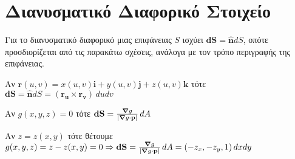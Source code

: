 \section*{Διανυσματικό Διαφορικό Στοιχείο}

\begin{dfn}
  Για το διανυσματικό διαφορικό μιας επιφάνειας $S$ ισχύει $ \mathbf{dS} =
  \mathbf{\widehat{n}}dS $, οπότε προσδιορίζεται από τις παρακάτω σχέσεις, ανάλογα με τον τρόπο περιγραφής της επιφάνειας.
  \begin{myitemize}
    \item Αν $ \mathbf{r}(u,v) = x(u,v)\mathbf{i}+y(u,v)\mathbf{j}+z(u,v)\mathbf{k} $ 
      τότε $ \mathbf{dS} = \mathbf{\widehat{n}} dS = (\mathbf{r_{u}} \times 
      \mathbf{r_{v}}) \, du dv $ 
    \item Αν $ g(x,y,z)=0 $ τότε $ \mathbf{dS} = \frac{\grad g}{\abs{\grad g 
      \cdot \mathbf{p}}}\, dA $
    \item Αν $ z=z(x,y) $ τότε θέτουμε $ g(x,y,z)=z-z(x,y)=0 \Rightarrow \mathbf{dS} 
      = \frac{\grad g}{\abs{\grad g \cdot \mathbf{p}}}\, dA = (-z_{x},-z_{y},1) 
      \, dx dy $
  \end{myitemize}
\end{dfn}


